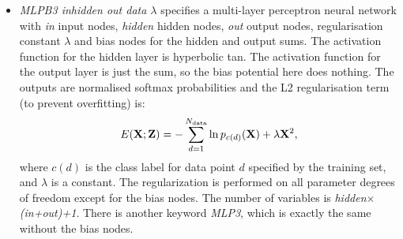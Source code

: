 \documentclass[12pt,a4paper,dvips]{article}
\begin{document}
\begin{itemize}
\item {\it MLPB3 inhidden out data $\lambda$} specifies a multi-layer perceptron neural network
with {\it in} input nodes, {\it hidden} hidden nodes, {\it out} output nodes, regularisation constant
$\lambda$ and bias nodes for the hidden and output sums.
The activation function for the hidden layer is hyperbolic tan.
The activation function for the output layer is just the sum, so the
bias potential here does nothing.
The outputs are normalised softmax probabilities and the
L2 regularisation term (to prevent overfitting) is:
\begin{equation}
E({\bf X};{\bf Z}) = -\sum_{d=1}^{N_{\rm data}} \ln p_{c(d)}({\bf X}) + \lambda {\bf X}^2,
\end{equation}
where $c(d)$ is the class label for data point $d$ specified by the training set,
and $\lambda$ is a constant.
The regularization is performed on all parameter degrees of freedom except for the bias nodes.
The number of variables is {\it hidden$\times$(in+out)+1}. There is another keyword
{\it MLP3}, which is exactly the same without the bias nodes.


\end{itemize}
\end{document}
